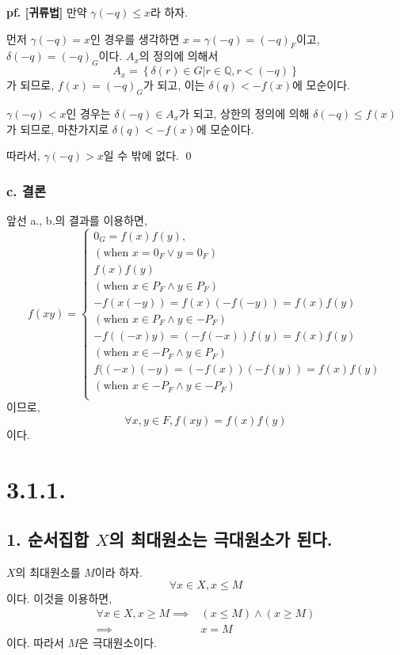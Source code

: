 \documentclass{article}
\begin{document}
\textbf{pf. [귀류법]} 만약 $\gamma(-q) \le x$라 하자.

먼저 $\gamma(-q) = x$인 경우를 생각하면 $x = \gamma(-q) = (-q)_F$이고, $\delta(-q) = (-q)_G$이다. $A_x$의 정의에 의해서 $$A_x = \left\{\delta(r) \in G \bigg| r \in \mathbb{Q}, r < (-q) \right\}$$
가 되므로, $f(x) = (-q)_G$가 되고, 이는 $\delta(q) < -f(x)$에 모순이다.

$\gamma(-q) < x$인 경우는 $\delta(-q) \in A_x$가 되고, 상한의 정의에 의해 $\delta(-q) \le f(x)$가 되므로, 마찬가지로 $\delta(q) < -f(x)$에 모순이다. 

따라서, $\gamma(-q) > x$일 수 밖에 없다. \qed

\subsubsection{c. 결론}

앞선 a., b.의 결과를 이용하면,
$$
f(xy) = 
\left\{\begin{matrix}
0_G = f(x)f(y),	\\ 
( \text{when } x = 0_F \vee y = 0_F ) \\
f(x)f(y)	\\ 
( \text{when } x \in P_F  \wedge y \in P_F ) \\
-f(x(-y)) = f(x)(-f(-y)) = f(x)f(y)	\\ 
( \text{when } x \in P_F  \wedge y \in -P_F ) \\
-f((-x)y) = (-f(-x))f(y) = f(x)f(y)	\\ 
( \text{when } x \in -P_F  \wedge y \in P_F ) \\
f((-x)(-y)=(-f(x))(-f(y))=f(x)f(y)\\
( \text{when } x \in -P_F  \wedge y \in -P_F ) \\
\end{matrix}\right. $$
이므로, 
$$ \forall x, y \in F, f(xy) = f(x)f(y)$$이다.


\section{3.1.1.}
\subsection{1. 순서집합 $X$의 최대원소는 극대원소가 된다.}
$X$의 최대원소를 $M$이라 하자.
$$\forall x \in X, x \le M$$
이다. 이것을 이용하면,
\begin{align*}
\forall x \in X, x \ge M \implies& (x \le M) \wedge (x \ge M)\\
\implies& x = M
\end{align*}
이다. 따라서 $M$은 극대원소이다.
\end{document}
